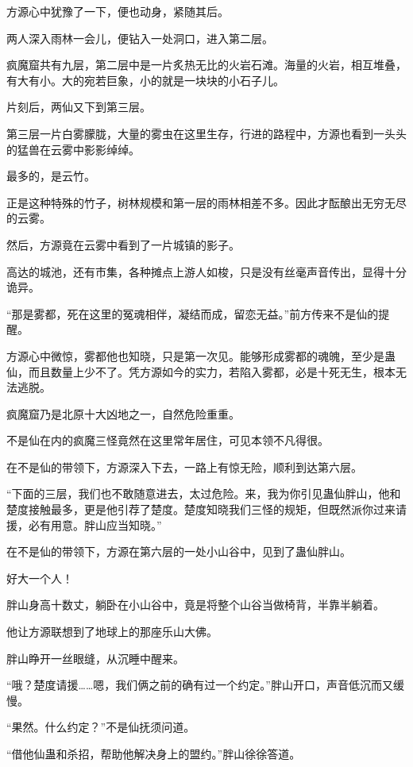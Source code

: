 \begin{this_body}
方源心中犹豫了一下，便也动身，紧随其后。

两人深入雨林一会儿，便钻入一处洞口，进入第二层。

疯魔窟共有九层，第二层中是一片炙热无比的火岩石滩。海量的火岩，相互堆叠，有大有小。大的宛若巨象，小的就是一块块的小石子儿。

片刻后，两仙又下到第三层。

第三层一片白雾朦胧，大量的雾虫在这里生存，行进的路程中，方源也看到一头头的猛兽在云雾中影影绰绰。

最多的，是云竹。

正是这种特殊的竹子，树林规模和第一层的雨林相差不多。因此才酝酿出无穷无尽的云雾。

然后，方源竟在云雾中看到了一片城镇的影子。

高达的城池，还有市集，各种摊点上游人如梭，只是没有丝毫声音传出，显得十分诡异。

“那是雾都，死在这里的冤魂相伴，凝结而成，留恋无益。”前方传来不是仙的提醒。

方源心中微惊，雾都他也知晓，只是第一次见。能够形成雾都的魂魄，至少是蛊仙，而且数量上少不了。凭方源如今的实力，若陷入雾都，必是十死无生，根本无法逃脱。

疯魔窟乃是北原十大凶地之一，自然危险重重。

不是仙在内的疯魔三怪竟然在这里常年居住，可见本领不凡得很。

在不是仙的带领下，方源深入下去，一路上有惊无险，顺利到达第六层。

“下面的三层，我们也不敢随意进去，太过危险。来，我为你引见蛊仙胖山，他和楚度接触最多，更是他引荐了楚度。楚度知晓我们三怪的规矩，但既然派你过来请援，必有用意。胖山应当知晓。”

在不是仙的带领下，方源在第六层的一处小山谷中，见到了蛊仙胖山。

好大一个人！

胖山身高十数丈，躺卧在小山谷中，竟是将整个山谷当做椅背，半靠半躺着。

他让方源联想到了地球上的那座乐山大佛。

胖山睁开一丝眼缝，从沉睡中醒来。

“哦？楚度请援……嗯，我们俩之前的确有过一个约定。”胖山开口，声音低沉而又缓慢。

“果然。什么约定？”不是仙抚须问道。

“借他仙蛊和杀招，帮助他解决身上的盟约。”胖山徐徐答道。

\end{this_body}

